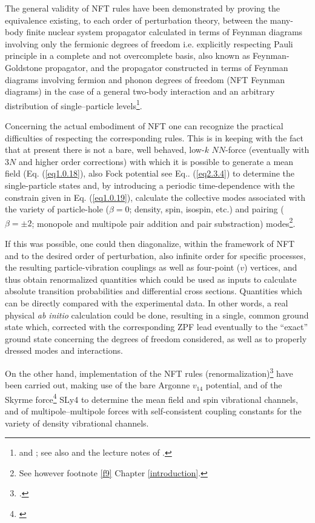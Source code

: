 The general validity of NFT rules have been demonstrated by proving the equivalence existing, to each order of perturbation theory, between the many-body finite nuclear system propagator calculated in terms of Feynman diagrams involving only the fermionic degrees of freedom i.e. explicitly respecting Pauli principle in a complete and not overcomplete basis, also known as Feynman-Goldstone propagator, and the propagator constructed in terms of Feynman diagrams involving fermion and phonon degrees of freedom (NFT Feynman diagrams) in the case of a general two-body interaction and an arbitrary distribution of single--particle levels\footnote{\cite{Bes:75} and \cite{Bes:76c}; see also \cite{Baranger:69} and the  lecture notes of  \cite{McFarlane:69}.}.



 Concerning the actual embodiment of NFT one can recognize the practical difficulties of respecting the corresponding rules. This is in keeping with the fact that at present there is not a  bare, well behaved, low-$k$ $NN$-force (eventually with 3$N$ and higher order corrections) with which it is possible to generate a mean field (Eq. (\ref{eq1.0.18}), also Fock potential see Eq.. (\ref{eq2.3.4})  to determine the single-particle states and, by introducing a periodic time-dependence with the constrain given in Eq. (\ref{eq1.0.19}),
calculate the collective modes associated with the variety of particle-hole ($\beta=0$; density, spin, isospin, etc.) and pairing ($\beta=\pm2$; monopole and multipole pair addition and pair substraction) modes\footnote{See however footnote \ref{f9} Chapter \ref{introduction}.}. 


If this was possible, one could then diagonalize, within the framework of NFT and to the desired order of perturbation, also infinite order for specific processes, the resulting particle-vibration couplings as well as four-point ($v$) vertices, and thus obtain renormalized quantities which could be used as inputs to calculate absolute transition probabilities and differential cross sections. Quantities which can be directly compared with the experimental data.
 In other words, a real physical \textit{ab initio} calculation could be done, resulting in a single,  common ground state which, corrected with the corresponding  ZPF lead eventually to the ``exact'' ground state concerning the degrees of freedom considered, as well as to properly dressed modes and  interactions.



On the other hand,  implementation of the NFT rules (renormalization)\footnote{\cite{Broglia:16}.} have been carried out, making use of the bare Argonne $v_{14}$ potential, and of the Skyrme  force\footnote{\cite{Chabanat:97}} SLy4 to determine the mean field and spin vibrational channels, and of multipole--multipole forces with self-consistent  coupling constants for the variety of density vibrational channels.


